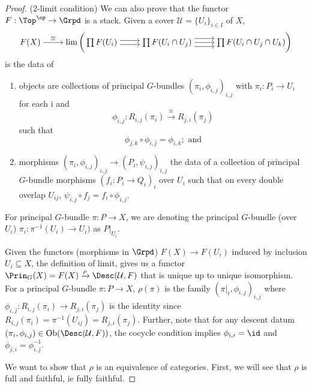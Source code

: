 \begin{proof}
    (2-limit condition) We can also prove that the functor $F: \Top^\op \to \Grpd$ is a stack. Given a cover \( \mathcal{U} = \{ U_i \}_{i \in I } \) of \( X \),
    \[\begin{tikzcd}[cramped]
    	{F(X)} & {\lim \bigg( \prod F(U_i)} & {\prod F(U_i \cap U_j)} & {\prod F(U_i \cap U_j \cap U_k) \bigg)}
    	\arrow["\cong", from=1-1, to=1-2]
    	\arrow[shift right, from=1-2, to=1-3]
    	\arrow[shift left, from=1-2, to=1-3]
    	\arrow[from=1-3, to=1-4]
    	\arrow[shift left=2, from=1-3, to=1-4]
    	\arrow[shift right=2, from=1-3, to=1-4]
    \end{tikzcd}\]
    is the data of
    \begin{enumerate}
        \item objects are collections of principal \( G \)-bundles \( (\pi_i,\phi_{i,j})_{i,j} \) with \( \pi_i: P_i \to U_i \) for each i and
        \[ \phi_{i,j} : R_{i,j}(\pi_i) \xrightarrow{\cong} R_{j,i}(\pi_j) \]
        such that
        \[ \phi_{j,k} \circ \phi_{i,j} = \phi_{i,k}; \text{ and} \]
        \item morphisms \( (\pi_i,\phi_{i,j})_{i,j} \to (P_i,\psi_{i,j})_{i,j} \) the data of a collection of principal \( G \)-bundle morphisms \( (f_i: P_i \to Q_i)_i \) over \( U_i \) such that on every double overlap \( U_{ij} \), \( \psi_{i,j} \circ f_j = f_i \circ \phi_{i,j} \).
    \end{enumerate}
    For principal \( G \)-bundle \( \pi: P \to X \), we are denoting the principal \( G \)-bundle (over \( U_i \)) \( \pi_{i}: \pi^{-1}(U_i) \to U_i) \) as \( P|_{U_i} \).
    
    Given the functors (morphisms in \( \Grpd \)) \( F(X) \to F(U_i) \) induced by inclusion \( U_i \subseteq X \), the definition of limit, gives us a functor \( \Prin_G(X) = F(X) \xrightarrow{\rho} \Desc(\mathcal{U},F) \) that is unique up to unique isomorphism. For a principal \( G \)-bundle \( \pi: P \to X \), \( \rho(\pi) \) is the family \( (\pi|_{i},\phi_{i,j})_{i,j} \) where \( \phi_{i,j}: R_{i,j}(\pi_i) \to R_{j,i}(\pi_j) \) is the identity since \( R_{i,j}(\pi_i) = \pi^{-1}(U_{ij}) = R_{j,i}(\pi_j) \). Further, note that for any descent datum \((\pi_i,\phi_{i,j}) \in \text{Ob}(\Desc(\mathcal{U}, F))\), the cocycle condition implies \( \phi_{i,i} = \id \) and \( \phi_{j,i} = \phi_{i,j}^{-1} \).
    
    We want to show that \( \rho \) is an equivalence of categories. First, we will see that \( \rho \) is full and faithful, ie fully faithful.
    

\end{proof}
